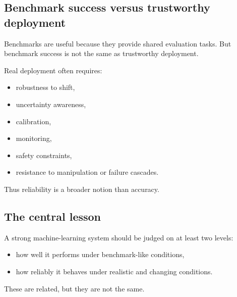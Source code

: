\subsection*{Benchmark success versus trustworthy deployment}

Benchmarks are useful because they provide shared evaluation tasks.
But benchmark success is not the same as trustworthy deployment.

\medskip

Real deployment often requires:
\begin{itemize}
    \item robustness to shift,
    \item uncertainty awareness,
    \item calibration,
    \item monitoring,
    \item safety constraints,
    \item resistance to manipulation or failure cascades.
\end{itemize}

Thus reliability is a broader notion than accuracy.

\subsection*{The central lesson}

A strong machine-learning system should be judged on at least two levels:
\begin{itemize}
    \item how well it performs under benchmark-like conditions,
    \item how reliably it behaves under realistic and changing conditions.
\end{itemize}

These are related, but they are not the same.

